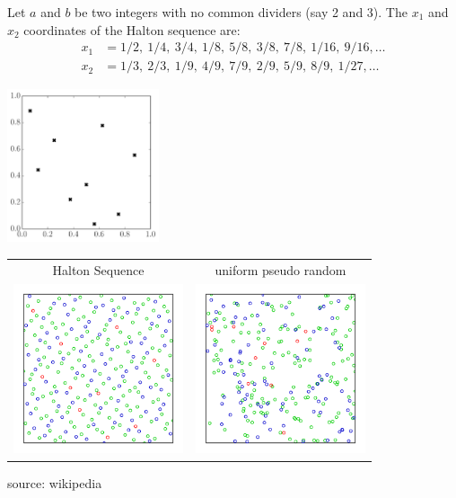 \documentclass{beamer}
\begin{document}
\begin{frame}{}
\begin{example}
	Let $a$ and $b$ be two integers with no common dividers (say 2 and 3). The $x_1$ and $x_2$ coordinates of the Halton sequence are:
	\begin{equation*}
		\begin{split}
			x_1 &= 1/2,\ 1/4,\ 3/4,\ 1/8,\ 5/8,\ 3/8,\ 7/8,\ 1/16,\ 9/16, \dots\\
			x_2 &= 1/3,\ 2/3,\ 1/9,\ 4/9,\ 7/9,\ 2/9,\ 5/9,\ 8/9,\ 1/27, \dots
		\end{split}
	\end{equation*}
\begin{center}
\includegraphics[height=4.5cm]{figures/python/spf_halton}
\end{center}

\end{example}
\end{frame}

\begin{frame}{}
\begin{example}
\begin{center}
  \begin{tabular}{cc}
Halton Sequence & uniform pseudo random \\
\includegraphics[height=5cm]{figures/Halton} & \includegraphics[height=5cm]{figures/random}
  \end{tabular}
 source: wikipedia
\end{center}
\end{example}
\end{frame}
\end{document}
